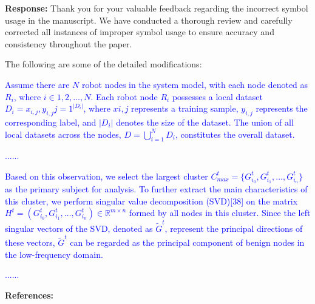\documentclass[a4paper,twoside,11pt,dvipsnames]{reviewresponse}
\begin{document}
\textbf{Response:} 
Thank you for your valuable feedback regarding the incorrect symbol usage in the manuscript. We have conducted a thorough review and carefully corrected all instances of improper symbol usage to ensure accuracy and consistency throughout the paper.

The following are some of the detailed modifications: 

\textcolor{blue}{Assume there are $N$ robot nodes in the system model, with each node denoted as $R_i$, where $i \in {1, 2, \ldots, N}$. Each robot node $R_i$ possesses a local dataset $D_i = {x_{i,j}, y_{i,j}}{j=1}^{|D_i|}$, where $x{i,j}$ represents a training sample, $y_{i,j}$ represents the corresponding label, and $|D_i|$ denotes the size of the dataset. The union of all local datasets across the nodes, $D = \bigcup_{i=1}^{N} D_i$, constitutes the overall dataset.}

\textcolor{blue}{......}

\textcolor{blue}{Based on this observation, we select the largest cluster \(C^t_{max} = \{G^t_{i_0}, G^t_{i_1}, \ldots, G^t_{i_n}\}\) as the primary subject for analysis. To further extract the main characteristics of this cluster, we perform singular value decomposition (SVD)[38] on the matrix $H^t = (G^t_{i_0}, G^t_{i_1}, \ldots, G^t_{i_n}) \in \mathbb{R}^{m \times n}$ formed by all nodes in this cluster. Since the left singular vectors of the SVD, denoted as \(\tilde{G}^t\), represent the principal directions of these vectors, \(\tilde{G}^t\) can be regarded as the principal component of benign nodes in the low-frequency domain.}

\textcolor{blue}{......}


\newpage

\textbf{\hspace{6.5cm}References:}





\end{document}
